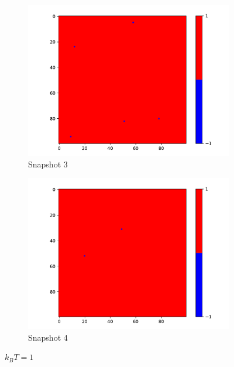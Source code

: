 \begin{figure}
    \vspace{0.5cm}
    
    \begin{subfigure}{0.45\textwidth}
      \centering
      \includegraphics[width=\linewidth]{images/Ising1_3.pdf}
      \caption{Snapshot 3}
      \label{fig:image3}
    \end{subfigure}
    \hfill
    \begin{subfigure}{0.45\textwidth}
      \centering
      \includegraphics[width=\linewidth]{images/Ising1_4.pdf}
      \caption{Snapshot 4}
      \label{fig:image4}
    \end{subfigure}
    \caption{$k_BT = 1$}
    \label{fig:two_by_two}
  \end{figure}

